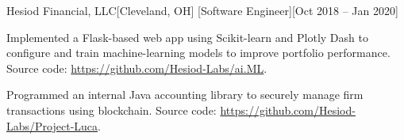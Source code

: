 \begin{ritemize}
	{Hesiod Financial, LLC}[Cleveland, OH]
	[Software Engineer][Oct 2018 -- Jan 2020]
	\item Implemented a Flask-based web app using Scikit-learn and Plotly Dash to configure and train machine-learning models to improve portfolio performance. Source code: \url{https://github.com/Hesiod-Labs/ai.ML}.
	\item Programmed an internal Java accounting library to securely manage firm transactions using blockchain. Source code: \url{https://github.com/Hesiod-Labs/Project-Luca}.
\end{ritemize}